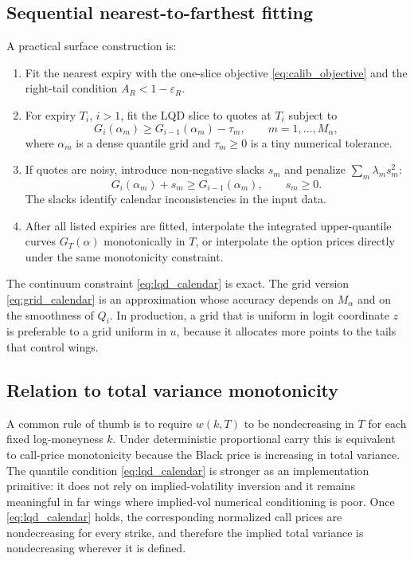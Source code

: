 \documentclass[11pt]{article}
\newcommand{\1}{\mathbf{1}}
\newcommand{\eps}{\varepsilon}
\begin{document}
\subsection{Sequential nearest-to-farthest fitting}

A practical surface construction is:
\begin{enumerate}[leftmargin=2.2em]
\item Fit the nearest expiry with the one-slice objective \eqref{eq:calib_objective} and the right-tail condition $A_R<1-\eps_R$.
\item For expiry $T_i$, $i>1$, fit the LQD slice to quotes at $T_i$ subject to
\begin{equation}
    G_i(\alpha_m)\ge G_{i-1}(\alpha_m)-\tau_m,
    \qquad m=1,\ldots,M_\alpha,\label{eq:grid_calendar}
\end{equation}
where $\alpha_m$ is a dense quantile grid and $\tau_m\ge0$ is a tiny numerical tolerance.
\item If quotes are noisy, introduce non-negative slacks $s_m$ and penalize $\sum_m\lambda_m s_m^2$:
\begin{equation}
    G_i(\alpha_m)+s_m\ge G_{i-1}(\alpha_m),
    \qquad s_m\ge0.\label{eq:slack_calendar}
\end{equation}
The slacks identify calendar inconsistencies in the input data.
\item After all listed expiries are fitted, interpolate the integrated upper-quantile curves $G_T(\alpha)$ monotonically in $T$, or interpolate the option prices directly under the same monotonicity constraint.
\end{enumerate}

The continuum constraint \eqref{eq:lqd_calendar} is exact.  The grid version \eqref{eq:grid_calendar} is an approximation whose accuracy depends on $M_\alpha$ and on the smoothness of $Q_i$.  In production, a grid that is uniform in logit coordinate $z$ is preferable to a grid uniform in $u$, because it allocates more points to the tails that control wings.

\subsection{Relation to total variance monotonicity}

A common rule of thumb is to require $w(k,T)$ to be nondecreasing in $T$ for each fixed log-moneyness $k$.  Under deterministic proportional carry this is equivalent to call-price monotonicity because the Black price is increasing in total variance.  The quantile condition \eqref{eq:lqd_calendar} is stronger as an implementation primitive: it does not rely on implied-volatility inversion and it remains meaningful in far wings where implied-vol numerical conditioning is poor.  Once \eqref{eq:lqd_calendar} holds, the corresponding normalized call prices are nondecreasing for every strike, and therefore the implied total variance is nondecreasing wherever it is defined.
\end{document}
